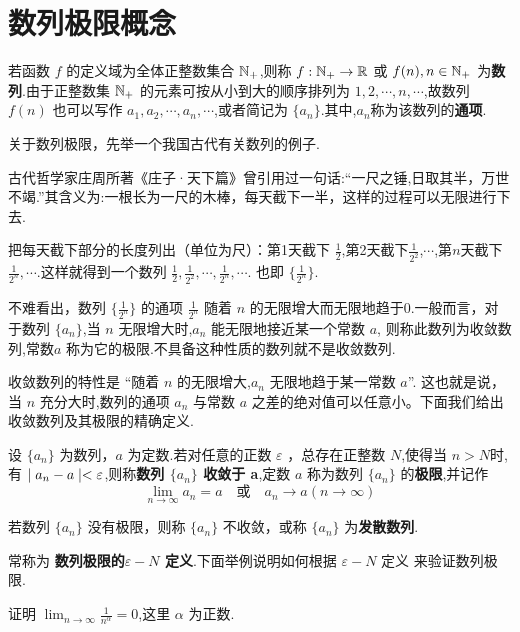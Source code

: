 \section{数列极限概念}

若函数 $f$ 的定义域为全体正整数集合 $\mathbb{N}_+$,则称 $f:\mathbb{N}_+\to \mathbb{R}$ 或 $f(n),n\in \mathbb{N}_+$ 为\textbf{数列}.由于正整数集 $\mathbb{N}_+$ 的元素可按从小到大的顺序排列为 $1,2,\cdots,n,\cdots$,故数列 $f(n)$ 也可以写作 $a_1,a_2,\cdots,a_n,\cdots$,或者简记为 $\{a_n\}$.其中,$a_n$称为该数列的\textbf{通项}.

关于数列极限，先举一个我国古代有关数列的例子.

\begin{example}
    古代哲学家庄周所著《庄子·天下篇》曾引用过一句话:“一尺之锤,日取其半，万世不竭.”其含义为:一根长为一尺的木棒，每天截下一半，这样的过程可以无限进行下去.
\end{example}

把每天截下部分的长度列出（单位为尺）：第1天截下 $\frac{1}{2}$,第2天截下$\frac{1}{2^2}$,$\cdots$,第$n$天截下 $\frac{1}{2^n},\cdots$.这样就得到一个数列 $\frac{1}{2},\frac{1}{2^2},\cdots,\frac{1}{2^n},\cdots$. 也即 $\{\frac{1}{2^n}\}$.

不难看出，数列 $\{\frac{1}{2^n}\}$ 的通项 $\frac{1}{2^n}$ 随着 $n$ 的无限增大而无限地趋于0.一般而言，对于数列 $\{a_n\}$,当 $n$ 无限增大时,$a_n$ 能无限地接近某一个常数 $a$, 则称此数列为收敛数列,常数$a$ 称为它的极限.不具备这种性质的数列就不是收敛数列.

收敛数列的特性是 “随着 $n$ 的无限增大,$a_n$ 无限地趋于某一常数 $a$”. 这也就是说，当 $n$ 充分大时,数列的通项 $a_n$ 与常数 $a$ 之差的绝对值可以任意小。下面我们给出收敛数列及其极限的精确定义.

\begin{definition}[数列极限]\label{def:shulie}
    设 $\{a_n\}$ 为数列，$a$ 为定数.若对任意的正数 $\varepsilon$ ，总存在正整数 $N$,使得当 $n>N$时,有 $\mid a_n-a \mid<\varepsilon$,则称\textbf{数列 $\{a_n\}$ 收敛于 a},定数 $a$ 称为数列 $\{a_n\}$ 的\textbf{极限},并记作
\[
    \lim\limits_{n\to \infty} a_n = a\quad \text{或} \quad a_n\to a(n\to \infty)
    \]

    若数列 $\{a_n\}$ 没有极限，则称 $\{a_n\}$ 不收敛，或称 $\{a_n\}$ 为\textbf{发散数列}.
\end{definition}

 常称为 \textbf{数列极限的$\varepsilon-N$ 定义}.下面举例说明如何根据 $\varepsilon-N$ 定义 来验证数列极限.

\begin{example}\label{ex:na}
    证明 $\lim_{n\to \infty}\frac{1}{n^\alpha}=0$,这里 $\alpha$ 为正数. 
\end{example}


